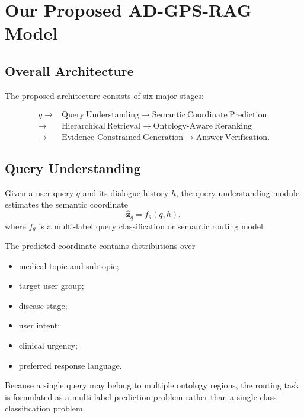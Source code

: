 \documentclass{article}
\begin{document}
\section{Our Proposed AD-GPS-RAG Model}


\subsection{Overall Architecture}

The proposed architecture consists of six major stages:

\begin{equation}
\begin{split}
    q
    \rightarrow&
    \mathrm{Query\ Understanding}
    \rightarrow
    \mathrm{Semantic\ Coordinate\ Prediction}\\
    \rightarrow&
    \mathrm{Hierarchical\ Retrieval}
    \rightarrow
    \mathrm{Ontology\text{-}Aware\ Reranking}\\
    \rightarrow&
    \mathrm{Evidence\text{-}Constrained\ Generation}
    \rightarrow
    \mathrm{Answer\ Verification}.
\end{split}
\end{equation}

\subsection{Query Understanding}

Given a user query $q$ and its dialogue history $h$, the query understanding 
module estimates the semantic coordinate
\begin{equation}
    \hat{\mathbf{z}}_q = f_{\theta}(q,h),
\end{equation}
where $f_{\theta}$ is a multi-label query classification or semantic routing 
model.

The predicted coordinate contains distributions over
\begin{itemize}
    \item medical topic and subtopic;
    \item target user group;
    \item disease stage;
    \item user intent;
    \item clinical urgency;
    \item preferred response language.
\end{itemize}
Because a single query may belong to multiple ontology regions, the routing 
task is formulated as a multi-label prediction problem rather than a 
single-class classification problem.
\end{document}
